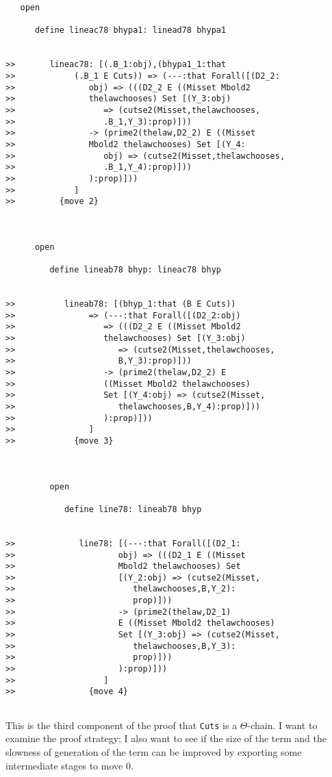 \documentclass[12pt]{article}
\begin{document}
\begin{verbatim}
   open

      define lineac78 bhypa1: linead78 bhypa1


>>       lineac78: [(.B_1:obj),(bhypa1_1:that
>>            (.B_1 E Cuts)) => (---:that Forall([(D2_2:
>>               obj) => (((D2_2 E ((Misset Mbold2
>>               thelawchooses) Set [(Y_3:obj)
>>                  => (cutse2(Misset,thelawchooses,
>>                  .B_1,Y_3):prop)]))
>>               -> (prime2(thelaw,D2_2) E ((Misset
>>               Mbold2 thelawchooses) Set [(Y_4:
>>                  obj) => (cutse2(Misset,thelawchooses,
>>                  .B_1,Y_4):prop)]))
>>               ):prop)]))
>>            ]
>>         {move 2}



      open

         define lineab78 bhyp: lineac78 bhyp


>>          lineab78: [(bhyp_1:that (B E Cuts))
>>               => (---:that Forall([(D2_2:obj)
>>                  => (((D2_2 E ((Misset Mbold2
>>                  thelawchooses) Set [(Y_3:obj)
>>                     => (cutse2(Misset,thelawchooses,
>>                     B,Y_3):prop)]))
>>                  -> (prime2(thelaw,D2_2) E
>>                  ((Misset Mbold2 thelawchooses)
>>                  Set [(Y_4:obj) => (cutse2(Misset,
>>                     thelawchooses,B,Y_4):prop)]))
>>                  ):prop)]))
>>               ]
>>            {move 3}



         open

            define line78: lineab78 bhyp


>>             line78: [(---:that Forall([(D2_1:
>>                     obj) => (((D2_1 E ((Misset
>>                     Mbold2 thelawchooses) Set
>>                     [(Y_2:obj) => (cutse2(Misset,
>>                        thelawchooses,B,Y_2):
>>                        prop)]))
>>                     -> (prime2(thelaw,D2_1)
>>                     E ((Misset Mbold2 thelawchooses)
>>                     Set [(Y_3:obj) => (cutse2(Misset,
>>                        thelawchooses,B,Y_3):
>>                        prop)]))
>>                     ):prop)]))
>>                  ]
>>               {move 4}


\end{verbatim}

This is the third component of the proof that {\tt Cuts} is a $\Theta$-chain.  I want to examine the proof strategy;  I also want to see if the size of the term and the slowness of generation of the term can be improved by exporting some intermediate stages to move 0.
\end{document}

